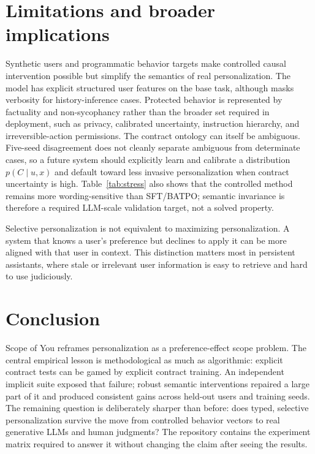 \section{Limitations and broader implications}
Synthetic users and programmatic behavior targets make controlled causal intervention possible but simplify the semantics of real personalization. The model has explicit structured user features on the base task, although \bench{} masks verbosity for history-inference cases. Protected behavior is represented by factuality and non-sycophancy rather than the broader set required in deployment, such as privacy, calibrated uncertainty, instruction hierarchy, and irreversible-action permissions. The contract ontology can itself be ambiguous. Five-seed disagreement does not cleanly separate ambiguous from determinate cases, so a future system should explicitly learn and calibrate a distribution $p(C\mid u,x)$ and default toward less invasive personalization when contract uncertainty is high. Table~\ref{tab:stress} also shows that the controlled method remains more wording-sensitive than SFT/BATPO; semantic invariance is therefore a required LLM-scale validation target, not a solved property.

Selective personalization is not equivalent to maximizing personalization. A system that knows a user's preference but declines to apply it can be more aligned with that user in context. This distinction matters most in persistent assistants, where stale or irrelevant user information is easy to retrieve and hard to use judiciously.

\section{Conclusion}
Scope of You reframes personalization as a preference-effect scope problem. The central empirical lesson is methodological as much as algorithmic: explicit contract tests can be gamed by explicit contract training. An independent implicit suite exposed that failure; robust semantic interventions repaired a large part of it and produced consistent gains across held-out users and training seeds. The remaining question is deliberately sharper than before: does typed, selective personalization survive the move from controlled behavior vectors to real generative LLMs and human judgments? The repository contains the experiment matrix required to answer it without changing the claim after seeing the results.

